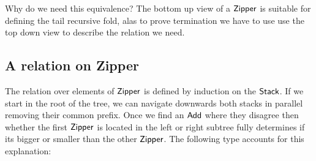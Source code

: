 \documentclass[sigplan,10pt,review]{acmart}
\newcommand{\AI}{\AgdaInductiveConstructor}
\newcommand{\AD}{\AgdaDatatype}
\begin{document}
Why do we need this equivalence? The bottom up view of a \ensuremath{\AD{Zipper}} is
suitable for defining the tail recursive fold, alas to prove
termination we have to use use the top down view to describe the
relation we need.

\subsection{A relation on Zipper}

The relation over elements of \ensuremath{\AD{Zipper}} is defined by induction on the
\ensuremath{\AD{Stack}}.  If we start in the root of the tree, we can navigate
downwards both stacks in parallel removing their common prefix. Once
we find an \ensuremath{\AI{Add}} where they disagree then whether the first \ensuremath{\AD{Zipper}}
is located in the left or right subtree fully determines if its bigger
or smaller than the other \ensuremath{\AD{Zipper}}.  The following type accounts for
this explanation:
\end{document}
